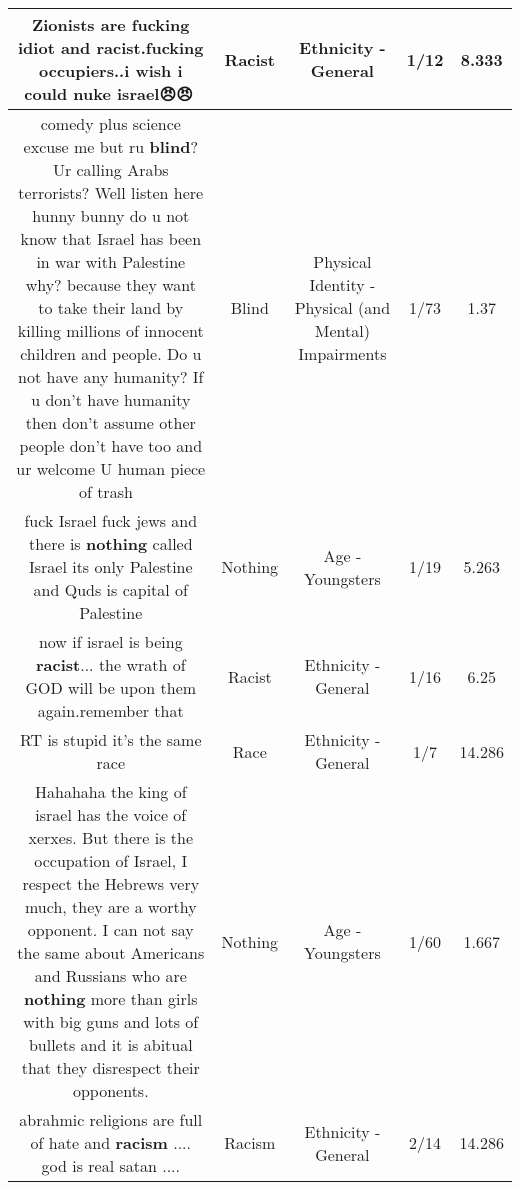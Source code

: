 \documentclass[11pt]{article}
\newlength\mylength
\begin{document}
\begin{center}
\begin{longtable}{|C{.65\mylength}|C{.30\mylength}|C{.12\mylength}|C{.12\mylength}|C{.12\mylength}|}
  \small Zionists are fucking idiot and \textbf{racist}.fucking occupiers..i wish i could nuke israel😠😠👺\normalsize   & Racist & Ethnicity - General & 1/12 & 8.333 \\  \hline
  \small comedy plus science excuse me but ru \textbf{blind}? Ur calling Arabs terrorists? Well listen here hunny bunny do u not know that Israel has been in war with Palestine why? because they want to take their land by killing millions of innocent children and people. Do u not have any humanity? If u don't have humanity then don't assume other people don't have too and ur welcome U human piece of trash  🙏\normalsize   & Blind & Physical Identity - Physical (and Mental) Impairments & 1/73 & 1.37 \\  \hline
  \small fuck Israel fuck jews and there is \textbf{nothing} called Israel its only Palestine and Quds is capital of Palestine\normalsize   & Nothing & Age - Youngsters & 1/19 & 5.263 \\  \hline
  \small now if israel is being \textbf{racist}... the wrath of GOD will be upon them again.remember that\normalsize   & Racist & Ethnicity - General & 1/16 & 6.25 \\  \hline
  \small RT is stupid it's the same race\normalsize   & Race & Ethnicity - General & 1/7 & 14.286 \\  \hline
  \small Hahahaha the king of israel has the voice of xerxes. But there is the occupation of Israel, I respect the Hebrews very much, they are a worthy opponent. I can not say the same about Americans and Russians who are \textbf{nothing} more than girls with big guns and lots of bullets and it is abitual that they disrespect their opponents.\normalsize   & Nothing & Age - Youngsters & 1/60 & 1.667 \\  \hline
  \small abrahmic religions are full of hate and \textbf{racism} .... god is real satan ....\normalsize   & Racism & Ethnicity - General & 2/14 & 14.286 \\  \hline

\end{longtable}
\end{center}
\end{document}
